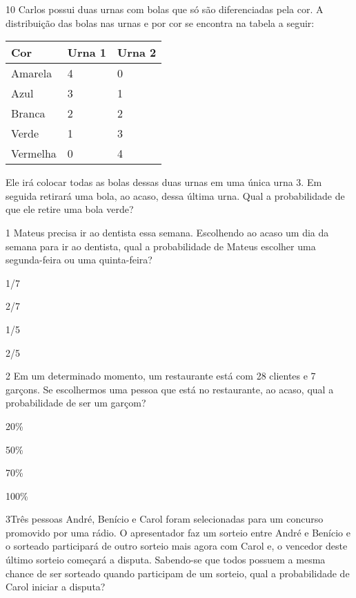 \num{10} Carlos possui duas urnas com bolas que só são diferenciadas pela
cor. A distribuição das bolas nas urnas e por cor se encontra na tabela
a seguir:

\begin{longtable}[]{@{}lll@{}}
\toprule
Cor & Urna 1 & Urna 2\tabularnewline
\midrule
\endhead
Amarela & 4 & 0\tabularnewline
Azul & 3 & 1\tabularnewline
Branca & 2 & 2\tabularnewline
Verde & 1 & 3\tabularnewline
Vermelha & 0 & 4\tabularnewline
\bottomrule
\end{longtable}

Ele irá colocar todas as bolas dessas duas urnas em uma única urna 3. Em
seguida retirará uma bola, ao acaso, dessa última urna. Qual a
probabilidade de que ele retire uma bola verde?




\num{1} Mateus precisa ir ao dentista essa semana. Escolhendo ao acaso um
dia da semana para ir ao dentista, qual a probabilidade de Mateus
escolher uma segunda-feira ou uma quinta-feira?

\begin{escolha}
\item
  1/7
\item
  2/7
\item
  1/5
\item
  2/5
\end{escolha}


\num{2} Em um determinado momento, um restaurante está com 28 clientes e 7
garçons. Se escolhermos uma pessoa que está no restaurante, ao acaso,
qual a probabilidade de ser um garçom?

\begin{escolha}
\item
  20\%
\item
  50\%
\item
  70\%
\item
  100\%
\end{escolha}


\num{3}Três pessoas André, Benício e Carol foram selecionadas para um
concurso promovido por uma rádio. O apresentador faz um sorteio entre
André e Benício e o sorteado participará de outro sorteio mais agora com
Carol e, o vencedor deste último sorteio começará a disputa. Sabendo-se
que todos possuem a mesma chance de ser sorteado quando participam de um
sorteio, qual a probabilidade de Carol iniciar a disputa?


